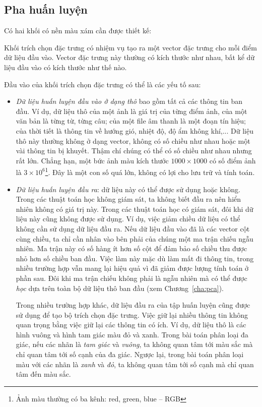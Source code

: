 \subsection{Pha huấn luyện}
Có hai khối có nền màu xám cần được thiết kế:  

Khối trích chọn đặc trưng có nhiệm vụ tạo ra một
vector đặc trưng cho mỗi điểm dữ liệu đầu vào. Vector đặc trưng này thường có
kích thước như nhau, bất kể dữ liệu đầu vào có kích thước như thế nào.

Đầu vào của khối trích chọn đặc trưng có thể là các yếu tố sau: 

\begin{itemize}
    \item \textit{Dữ liệu huấn luyện đầu vào ở dạng thô} bao gồm tất cả các thông tin ban đầu. Ví dụ, dữ liệu thô của một ảnh là
    giá trị của từng điểm ảnh, của một văn bản là từng từ, từng câu; của một
    file âm thanh là một đoạn tín hiệu; của thời tiết là thông tin về hướng gió,
    nhiệt độ, độ ẩm không khí,... Dữ liệu thô này thường không ở dạng vector,
    không có số chiều như nhau hoặc một vài thông tin bị khuyết. Thậm chí chúng
    có thể có số chiều như nhau nhưng rất lớn. Chẳng hạn, một bức ảnh màu kích
    thước $1000\times 1000$ có số điểm ảnh là $3 \times 10^6$\footnote{Ảnh màu
    thường có ba kênh: red, green, blue -- RGB}. Đây là một con số quá lớn, không có lợi cho lưu
    trữ và tính toán.

    \item \textit{Dữ liệu huấn luyện đầu ra}: dữ liệu này có thể được sử dụng
    hoặc không. Trong các thuật toán học không giám sát, ta không biết đầu ra
    nên hiển nhiên không có giá trị này. Trong các thuật toán học có giám sát,
    đôi khi dữ liệu này cũng không được sử dụng. Ví dụ, việc giảm chiều dữ liệu
    có thể không cần sử dụng dữ liệu đầu ra. Nếu dữ liệu đầu vào đã là các
    vector cột cùng chiều, ta chỉ cần nhân vào bên phải của chúng một ma trận
    chiếu ngẫu nhiên. Ma trận này có số hàng ít hơn số cột để đảm bảo số chiều
    thu được nhỏ hơn số chiều ban đầu. Việc làm này mặc dù làm mất đi thông tin,
    trong nhiều trường hợp vẫn mang lại hiệu quả vì đã giảm được lượng tính toán
    ở phần sau. Đôi khi {ma trận chiếu} không phải là ngẫu nhiên mà có thể được
    \textit{học} dựa trên toàn bộ dữ liệu thô ban đầu (xem Chương~\ref{cha:pca}).

    Trong nhiều trường hợp khác, dữ liệu đầu ra của tập huấn luyện cũng được sử
    dụng để tạo bộ trích chọn đặc trưng. Việc giữ lại
    nhiều thông tin không quan trọng bằng việc giữ lại các thông tin có ích. Ví dụ, dữ liệu thô là các hình vuông và hình tam giác màu đỏ và xanh.
    Trong bài toán phân loại đa giác, nếu các nhãn là \textit{tam giác} và
    \textit{vuông}, ta không quan tâm tới màu sắc mà chỉ quan tâm tới số cạnh
    của đa giác. Ngược lại, trong bài toán phân loại màu với các nhãn là
    \textit{xanh} và \textit{đỏ}, ta không quan tâm tới số cạnh mà chỉ quan tâm
    đến màu sắc.


\end{itemize}
